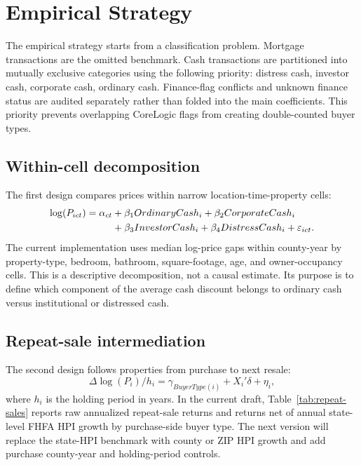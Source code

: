 \documentclass[12pt, letterpaper]{article}
\begin{document}


\section{Empirical Strategy}\label{sec:strategy}

The empirical strategy starts from a classification problem. Mortgage transactions are the omitted benchmark. Cash transactions are partitioned into mutually exclusive categories using the following priority: distress cash, investor cash, corporate cash, ordinary cash. Finance-flag conflicts and unknown finance status are audited separately rather than folded into the main coefficients. This priority prevents overlapping CoreLogic flags from creating double-counted buyer types.

\subsection{Within-cell decomposition}

The first design compares prices within narrow location-time-property cells:
\begin{align}
\log(P_{ict}) = \alpha_{ct}
  &+ \beta_1 OrdinaryCash_i + \beta_2 CorporateCash_i \notag\\
  &+ \beta_3 InvestorCash_i + \beta_4 DistressCash_i + \varepsilon_{ict}.
\end{align}
The current implementation uses median log-price gaps within county-year by property-type, bedroom, bathroom, square-footage, age, and owner-occupancy cells. This is a descriptive decomposition, not a causal estimate. Its purpose is to define which component of the average cash discount belongs to ordinary cash versus institutional or distressed cash.

\subsection{Repeat-sale intermediation}

The second design follows properties from purchase to next resale:
\[
\Delta \log(P_i) / h_i = \gamma_{BuyerType(i)} + X_i'\delta + \eta_i,
\]
where $h_i$ is the holding period in years. In the current draft, Table~\ref{tab:repeat-sales} reports raw annualized repeat-sale returns and returns net of annual state-level FHFA HPI growth by purchase-side buyer type. The next version will replace the state-HPI benchmark with county or ZIP HPI growth and add purchase county-year and holding-period controls.
\end{document}
